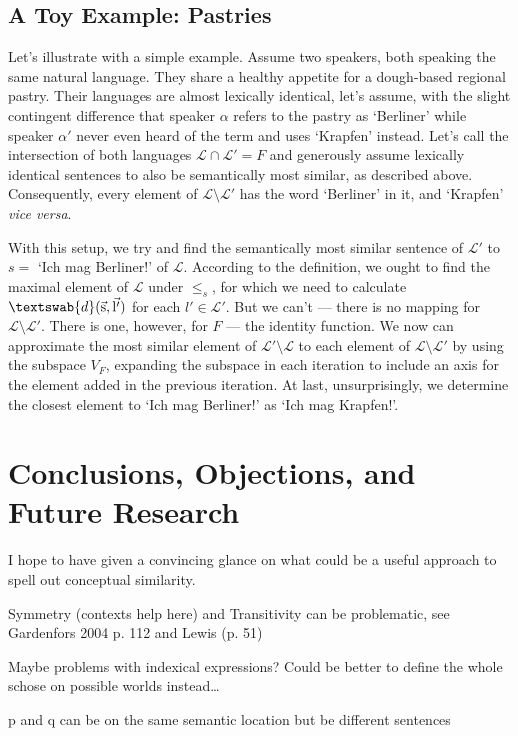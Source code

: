 \documentclass[11pt, a4paper]{scrartcl}
\renewcommand{\i}[1]{\emph{#1}}
\renewcommand{\L}{\mathcal{L}}
\renewcommand{\v}[1]{\vec{\mathrm{#1}}}
\newcommand{\m}[1]{\textswab{#1}}
\begin{document}
\subsection{A Toy Example: Pastries}

Let's illustrate with a simple example. Assume two speakers, both speaking the same natural language. They share a healthy appetite for a dough-based regional pastry. Their languages are almost lexically identical, let's assume, with the slight contingent difference that speaker $\alpha$ refers to the pastry as `Berliner' while speaker $\alpha'$ never even heard of the term and uses `Krapfen' instead. Let's call the intersection of both languages $\L \cap \L' = F$ and generously assume lexically identical sentences to also be semantically most similar, as described above. Consequently, every element of $\L\setminus \L'$ has the word `Berliner' in it, and `Krapfen' \i{vice versa}.

With this setup, we try and find the semantically most similar sentence of $\L'$ to $s =$ `Ich mag Berliner!' of $\L$. According to the definition, we ought to find the maximal element of $\L$ under $\leqslant_s$, for which we need to calculate $\m{d}(\v{s},\v{l'})$ for each $l' \in \L'$. But we can't --- there is no mapping for $\L\setminus\L'$. There is one, however, for $F$ --- the identity function. We now can approximate the most similar element of $\L'\setminus\L$ to each element of $\L\setminus\L'$ by using the subspace $V_F$, expanding the subspace in each iteration to include an axis for the element added in the previous iteration. At last, unsurprisingly, we determine the closest element to `Ich mag Berliner!' as `Ich mag Krapfen!'. 

\section{Conclusions, Objections, and Future Research}

I hope to have given a convincing glance on what could be a useful approach to spell out conceptual similarity.  

Symmetry (contexts help here) and Transitivity can be problematic, see Gardenfors 2004 p. 112 and Lewis (p. 51)

Maybe problems with indexical expressions? Could be better to define the whole schose on possible worlds instead\ldots

p and q can be on the same semantic location but be different sentences
\end{document}
